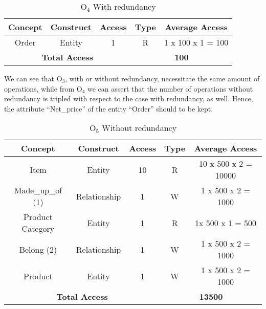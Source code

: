 \begin{table}[!h]\caption{	$ \textrm{O}_\textrm{4} $ With redundancy }
	\begin{center}
		\begin{tabular}{| c | c | c | c | c |}
			\hline
			\textbf{Concept} & \textbf{Construct} & \textbf{Access} & \textbf{Type} & \textbf{Average Access} \\ \hline
			Order & Entity & 1 & R & 1 x 100 x 1 = 100 \\ \hline
			\multicolumn{3}{|c|}{\textbf{Total Access}} & \multicolumn{2}{|c|}{\textbf{100}} \\ \hline
		\end{tabular}
	\end{center}
\end{table}
\newpage
We can see that $ \textrm{O}_\textrm{3} $, with or without redundancy, necessitate the same amount of operations, while from $ \textrm{O}_\textrm{4} $ we can assert that the number of operations without redundancy is tripled with respect to the case with redundancy, as well. Hence, the attribute ``Net\_price'' of the entity ``Order'' should to be kept.
\begin{table}[!h]\caption{	$ \textrm{O}_\textrm{5} $ Without redundancy }
	\begin{center}
		\begin{tabular}{| c | c | c | c | c |}
			\hline
			\textbf{Concept} & \textbf{Construct} & \textbf{Access} & \textbf{Type} & \textbf{Average Access} \\ \hline
			Item & Entity & 10 & R & 10 x 500 x 2 = 10000 \\ \hline
			Made\_up\_of (1) & Relationship & 1 & W & 1 x 500 x 2 = 1000 \\ \hline
			Product Category & Entity & 1 & R & 1x 500 x 1 = 500 \\ \hline
			Belong (2) & Relationship & 1 & W & 1 x 500 x 2 = 1000 \\ \hline
			Product & Entity & 1 & W & 1 x 500 x 2 = 1000 \\ \hline

			\multicolumn{3}{|c|}{\textbf{Total Access}} & \multicolumn{2}{|c|}{\textbf{13500}} \\ \hline
		\end{tabular}
	\end{center}
\end{table}
